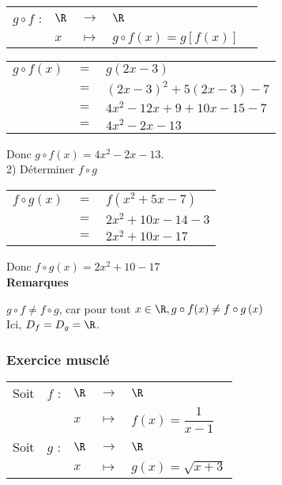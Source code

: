 \begin{tabular}{lllll}
$g \circ f$ : & $\R$ & $\longrightarrow$ & $\R$ \\
& $x$ & $\longmapsto$ & $g \circ f\left(x\right) = g\left[f\left(x\right)\right]$ \\
\end{tabular}

\begin{tabular}{lll}
$g \circ f\left(x\right)$ & $=$ &$g\left(2x - 3\right)$ \\
& $=$ & $\left(2x - 3\right)^2 + 5\left(2x - 3\right) - 7$ \\
& $=$ & $4x^2 - 12x + 9 + 10x - 15 - 7$ \\
& $=$ & $4x^2 -2x -13 $ \\
\end{tabular}

\vspace*{.3cm}

Donc $g \circ f\left(x\right) = 4x^2 -2x -13$. \\

2) Déterminer $f \circ g$

\begin{tabular}{lll}
$f \circ g\left(x\right)$ & $=$ &$f\left(x^2 + 5x - 7\right)$ \\
& $=$ & $2x^2 + 10x - 14 - 3$ \\
& $=$ & $2x^2 + 10x - 17 $ \\
\end{tabular}

\vspace*{.3cm}

Donc $f \circ g\left(x\right) = 2x^2 + 10 - 17$ \\

\textbf{Remarques}

$g \circ f \neq f \circ g$, car pour tout $x \in \R, g \circ f(x) \neq f \circ g\left(x\right)$ \\

Ici, $D_f = D_g = \R$.

\newpage

\vspace*{-1cm}

\subsubsection{Exercice musclé}

\begin{tabular}{lllll}
Soit & $f$ : & $\R$ & $\longrightarrow$ & $\R$ \\
& & $x$ & $\longmapsto$ & $f\left(x\right) = \dfrac{1}{x-1}$\\
Soit & $g$ : & $\R$ & $\longrightarrow$ & $\R$ \\
& & $x$ & $\longmapsto$ & $g\left(x\right) = \sqrt{x+3}$ \\
\end{tabular}

